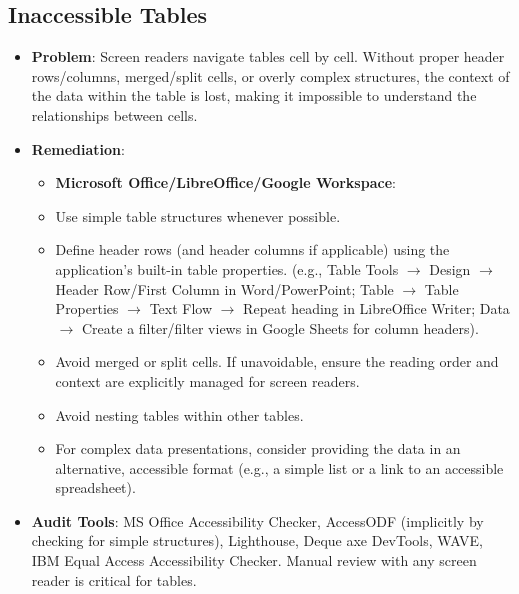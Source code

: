 \subsection{Inaccessible Tables}
\label{subsec:inaccessible-tables}
\begin{itemize}
    \item \textbf{Problem}: Screen readers navigate tables cell by cell. Without proper header rows/columns, merged/split cells, or overly complex structures, the context of the data within the table is lost, making it impossible to understand the relationships between cells.

    \item \textbf{Remediation}:
        \begin{itemize}
            \item \textbf{Microsoft Office/LibreOffice/Google Workspace}:
            \item Use simple table structures whenever possible.
            \item Define header rows (and header columns if applicable) using the application's built-in table properties. (e.g., Table Tools $\rightarrow$ Design $\rightarrow$ Header Row/First Column in Word/PowerPoint; Table $\rightarrow$ Table Properties $\rightarrow$ Text Flow $\rightarrow$ Repeat heading in LibreOffice Writer; Data $\rightarrow$ Create a filter/filter views in Google Sheets for column headers).
            \item Avoid merged or split cells. If unavoidable, ensure the reading order and context are explicitly managed for screen readers.
            \item Avoid nesting tables within other tables.
            \item For complex data presentations, consider providing the data in an alternative, accessible format (e.g., a simple list or a link to an accessible spreadsheet).
        \end{itemize}

    \item \textbf{Audit Tools}: MS Office Accessibility Checker, AccessODF (implicitly by checking for simple structures), Lighthouse, Deque axe DevTools, WAVE, IBM Equal Access Accessibility Checker. Manual review with any screen reader is critical for tables.

\end{itemize}

